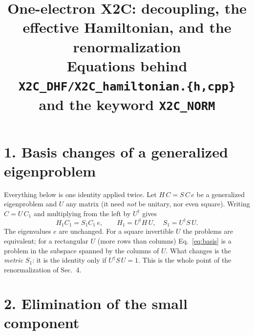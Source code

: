 \documentclass[11pt]{article}
\title{One-electron X2C: decoupling, the effective Hamiltonian, and the renormalization\\
\large Equations behind \texttt{X2C\_DHF/X2C\_hamiltonian.\{h,cpp\}} and the keyword \texttt{X2C\_NORM}}
\author{}
\date{}
\newcommand{\dg}{^{\dagger}}
\begin{document}
\sloppy
\maketitle

\section*{1. Basis changes of a generalized eigenproblem}

Everything below is one identity applied twice. Let $H\,C = S\,C\,e$ be a generalized eigenproblem and
$U$ any matrix (it need \emph{not} be unitary, nor even square). Writing $C = U\,C_1$ and multiplying from
the left by $U^\dagger$ gives
\begin{equation}
H_1 C_1 = S_1 C_1\, e,\qquad H_1 = U\dg H\,U,\quad S_1 = U\dg S\,U .
\label{eq:basis}
\end{equation}
The eigenvalues $e$ are unchanged. For a square invertible $U$ the problems are equivalent; for a rectangular
$U$ (more rows than columns) Eq.~\eqref{eq:basis} is a problem in the subspace spanned by the columns of $U$.
What changes is the \emph{metric} $S_1$: it is the identity only if $U\dg S\,U=1$. This is the whole point of the
renormalization of Sec.~4.

\section*{2. Elimination of the small component}
\end{document}
